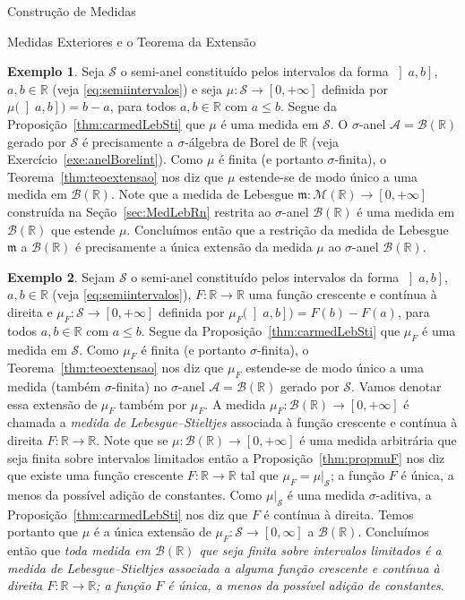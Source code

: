 \documentclass[oneside,final,11pt]{amsbook}
\newcommand{\R}{\mathds R}
\newcommand{\leb}{\mathfrak m}
\newcommand{\Borel}{\mathcal B}
\newcommand{\Lebmens}{\mathcal M}
\theoremstyle{remark}\newtheorem{exercise}{Exercício}[chapter]
\theoremstyle{remark}\newtheorem{*exercise}[exercise]{\hbox to 0pt{\hskip 0pt minus 1fil*}Exercício}
\theoremstyle{definition}\newtheorem{exdefin}{Definição}[chapter]
\theoremstyle{plain}\newtheorem{teo}{Teorema}[section]
\theoremstyle{plain}\newtheorem{lem}[teo]{Lema}
\theoremstyle{plain}\newtheorem{prop}[teo]{Proposição}
\theoremstyle{plain}\newtheorem{cor}[teo]{Corolário}
\theoremstyle{definition}\newtheorem{defin}[teo]{Definição}
\theoremstyle{remark}\newtheorem{rem}[teo]{Observação}
\theoremstyle{definition}\newtheorem{notation}[teo]{Notação}
\theoremstyle{definition}\newtheorem{convention}[teo]{Convenção}
\theoremstyle{definition}\newtheorem{example}[teo]{Exemplo}
\numberwithin{section}{chapter}
\numberwithin{equation}{section}
\begin{document}
\begin{chapter}{Construção de Medidas}
\begin{section}{Medidas Exteriores e o Teorema da Extensão}
\begin{example}\label{exa:Lebesgueagain}
Seja $\mathcal S$ o semi-anel constituído pelos intervalos da forma $\left]a,b\right]$, $a,b\in\R$
(veja \eqref{eq:semiintervalos}) e seja $\mu:\mathcal S\to[0,+\infty]$ definida por
$\mu\big(\left]a,b\right]\big)=b-a$, para todos $a,b\in\R$ com $a\le b$. Segue da Proposição~\ref{thm:carmedLebSti}
que $\mu$ é uma medida em $\mathcal S$. O $\sigma$-anel $\mathcal A=\Borel(\R)$ gerado por $\mathcal S$ é precisamente a $\sigma$-álgebra
de Borel de $\R$ (veja Exercício~\ref{exe:anelBorelint}). Como $\mu$ é finita (e portanto $\sigma$-finita),
o Teorema~\ref{thm:teoextensao} nos diz que $\mu$ estende-se de modo único a uma medida em $\Borel(\R)$.
Note que a medida de Lebesgue $\leb:\Lebmens(\R)\to[0,+\infty]$ construída na Seção~\ref{sec:MedLebRn}
restrita ao $\sigma$-anel $\Borel(\R)$ é uma medida em $\Borel(\R)$ que estende $\mu$. Concluímos então
que a restrição da medida de Lebesgue $\leb$ a $\Borel(\R)$ é precisamente a única extensão da medida
$\mu$ ao $\sigma$-anel $\Borel(\R)$.
\end{example}

\begin{example}
Sejam $\mathcal S$ o semi-anel constituído pelos intervalos da forma $\left]a,b\right]$, $a,b\in\R$
(veja \eqref{eq:semiintervalos}), $F:\R\to\R$ uma função crescente e contínua à direita e
$\mu_F:\mathcal S\to[0,+\infty]$ definida por $\mu_F\big(\left]a,b\right]\big)=F(b)-F(a)$, para todos
$a,b\in\R$ com $a\le b$. Segue da Proposição~\ref{thm:carmedLebSti} que $\mu_F$ é uma medida em $\mathcal S$.
Como $\mu_F$ é finita (e portanto $\sigma$-finita), o Teorema~\ref{thm:teoextensao} nos diz que $\mu_F$ estende-se
de modo único a uma medida (também $\sigma$-finita) no $\sigma$-anel $\mathcal A=\Borel(\R)$ gerado por $\mathcal S$.
Vamos denotar essa extensão de $\mu_F$ também por $\mu_F$. A medida $\mu_F:\Borel(\R)\to[0,+\infty]$ é chamada
a {\em medida de Lebesgue--Stieltjes\/}%
 associada à função crescente e contínua à direita $F:\R\to\R$.
Note que se $\mu:\Borel(\R)\to[0,+\infty]$ é uma medida arbitrária que seja finita sobre intervalos limitados
então a Proposição~\ref{thm:propmuF} nos diz que existe uma função crescente $F:\R\to\R$ tal que
$\mu_F=\mu\vert_{\mathcal S}$; a função $F$ é única, a menos da possível adição de constantes.
Como $\mu\vert_{\mathcal S}$ é uma medida $\sigma$-aditiva, a Proposição~\ref{thm:carmedLebSti} nos diz que
$F$ é contínua à direita. Temos portanto que $\mu$ é a única extensão de $\mu_F:\mathcal S\to[0,\infty]$ a
$\Borel(\R)$. Concluímos então que {\em toda medida em $\Borel(\R)$ que seja finita sobre intervalos limitados
é a medida de Lebesgue--Stieltjes associada a alguma função crescente e contínua à direita $F:\R\to\R$; a função
$F$ é única, a menos da possível adição de constantes}.
\end{example}


\end{section}
\end{chapter}
\end{document}
